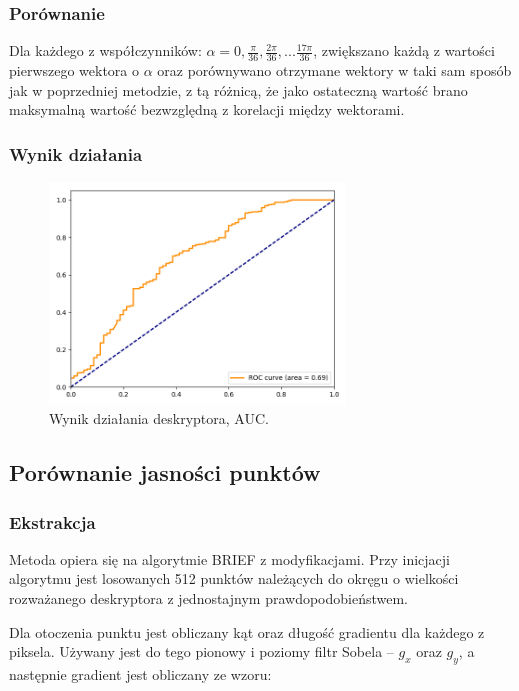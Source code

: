 \documentclass[a4paper,11pt]{article}
\begin{document}
\subsubsection{Porównanie}
Dla każdego z współczynników: $\alpha = 0, \frac{\pi}{36}, \frac{2\pi}{36},...\frac{17\pi}{36}$, zwiększano każdą z wartości pierwszego wektora o $\alpha$ oraz porównywano otrzymane wektory w taki sam sposób jak w poprzedniej metodzie, z tą różnicą, że jako ostateczną wartość brano maksymalną wartość bezwzględną z korelacji między wektorami.


\subsubsection{Wynik działania}

\begin{figure}[H]
\begin{center}
\includegraphics[width=0.7\textwidth]{./img/max_on_circle.png}
\end{center}
\caption{Wynik działania deskryptora, AUC.}
\end{figure}


\subsection{Porównanie jasności punktów}
\subsubsection{Ekstrakcja}
Metoda opiera się na algorytmie BRIEF z modyfikacjami. Przy inicjacji algorytmu jest losowanych 512 punktów należących do okręgu o wielkości rozważanego deskryptora z jednostajnym prawdopodobieństwem.


Dla otoczenia punktu jest obliczany kąt oraz długość gradientu dla każdego z piksela. Używany jest do tego pionowy i poziomy filtr Sobela -- $g_x$ oraz $g_y$, a następnie gradient jest obliczany ze wzoru:
\end{document}
